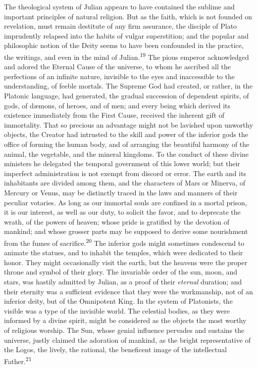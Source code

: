 The theological system of Julian appears to have contained the
sublime and important principles of natural religion. But as the
faith, which is not founded on revelation, must remain destitute
of any firm assurance, the disciple of Plato imprudently relapsed
into the habits of vulgar superstition; and the popular and
philosophic notion of the Deity seems to have been confounded in
the practice, the writings, and even in the mind of Julian.\textsuperscript{19}
The pious emperor acknowledged and adored the Eternal Cause of
the universe, to whom he ascribed all the perfections of an
infinite nature, invisible to the eyes and inaccessible to the
understanding, of feeble mortals. The Supreme God had created, or
rather, in the Platonic language, had generated, the gradual
succession of dependent spirits, of gods, of dæmons, of heroes,
and of men; and every being which derived its existence
immediately from the First Cause, received the inherent gift of
immortality. That so precious an advantage might not be lavished
upon unworthy objects, the Creator had intrusted to the skill and
power of the inferior gods the office of forming the human body,
and of arranging the beautiful harmony of the animal, the
vegetable, and the mineral kingdoms. To the conduct of these
divine ministers he delegated the temporal government of this
lower world; but their imperfect administration is not exempt
from discord or error. The earth and its inhabitants are divided
among them, and the characters of Mars or Minerva, of Mercury or
Venus, may be distinctly traced in the laws and manners of their
peculiar votaries. As long as our immortal souls are confined in
a mortal prison, it is our interest, as well as our duty, to
solicit the favor, and to deprecate the wrath, of the powers of
heaven; whose pride is gratified by the devotion of mankind; and
whose grosser parts may be supposed to derive some nourishment
from the fumes of sacrifice.\textsuperscript{20} The inferior gods might sometimes
condescend to animate the statues, and to inhabit the temples,
which were dedicated to their honor. They might occasionally
visit the earth, but the heavens were the proper throne and
symbol of their glory. The invariable order of the sun, moon, and
stars, was hastily admitted by Julian, as a proof of their
\textit{eternal} duration; and their eternity was a sufficient evidence
that they were the workmanship, not of an inferior deity, but of
the Omnipotent King. In the system of Platonists, the visible was
a type of the invisible world. The celestial bodies, as they were
informed by a divine spirit, might be considered as the objects
the most worthy of religious worship. The Sun, whose genial
influence pervades and sustains the universe, justly claimed the
adoration of mankind, as the bright representative of the Logos,
the lively, the rational, the beneficent image of the
intellectual Father.\textsuperscript{21}

